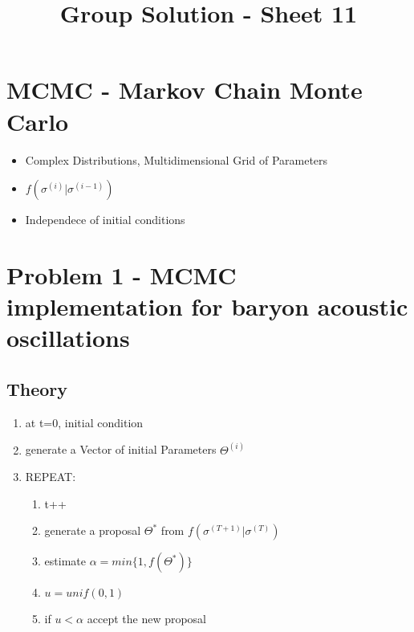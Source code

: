 \documentclass[]{scrartcl}
\title{Group Solution - Sheet 11}
\begin{document}
  \maketitle
  \section*{MCMC - Markov Chain Monte Carlo}
    \begin{itemize}
      \item Complex Distributions, Multidimensional Grid of Parameters
      \item $f(\sigma^{(i)}| \sigma^{(i-1)})$
      \item Independece of initial conditions
    \end{itemize}

  \section*{Problem 1 - MCMC implementation for baryon acoustic oscillations}
    \subsection{Theory}
      \begin{enumerate}
        \item at t=0, initial condition
        \item generate a Vector of initial Parameters $\Theta^{(i)}$
        \item REPEAT:
          \begin{enumerate}
            \item t++
            \item generate a proposal $\Theta^*$ from $f(\sigma^{(T+1)}| \sigma^{(T)})$
            \item estimate $\alpha=min\{ 1, f(\Theta^*) \}$
            \item $u = unif(0,1)$
            \item if $u < \alpha$ accept the new proposal
          \end{enumerate}
      \end{enumerate}
\end{document}
